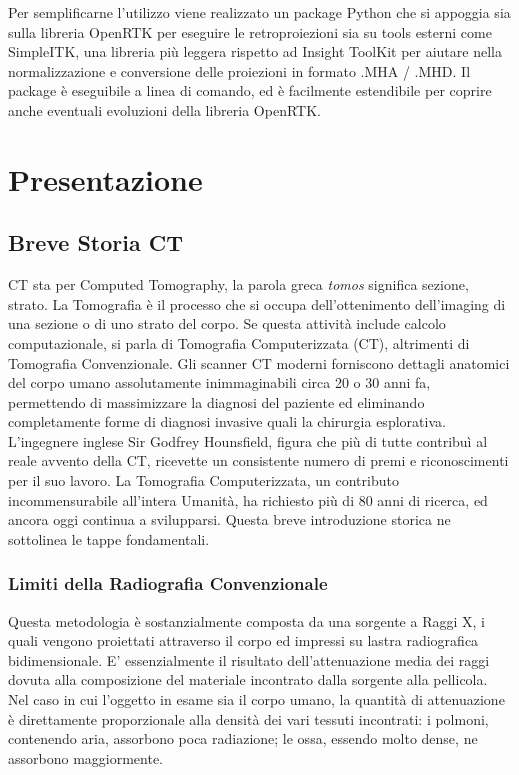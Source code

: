\documentclass[a4paper,12pt, doubleside]{report}
\begin{document}
        \par
            Per semplificarne l'utilizzo viene realizzato un package Python che si appoggia sia sulla libreria OpenRTK per eseguire le retroproiezioni sia su tools esterni come SimpleITK, una libreria più leggera rispetto ad Insight ToolKit per aiutare nella normalizzazione e conversione delle proiezioni in formato .MHA / .MHD.
            Il package è eseguibile a linea di comando, ed è facilmente estendibile per coprire anche eventuali evoluzioni della libreria OpenRTK.
    
        \par
            [TODO nella sezione X si fa Y etc bla di blabla, il secondo di blabla]
    
    \newpage
    \tableofcontents
    \newpage
    \chapter{Presentazione}
        \section{Breve Storia CT}
            \par
                CT sta per Computed Tomography, la parola greca \textit{tomos} significa sezione, strato. La Tomografia è il processo che si occupa dell'ottenimento dell'imaging di una sezione o di uno strato del corpo. Se questa attività include calcolo computazionale, si parla di Tomografia Computerizzata (CT), altrimenti di Tomografia Convenzionale.
                Gli scanner CT moderni forniscono dettagli anatomici del corpo umano assolutamente inimmaginabili circa 20 o 30 anni fa, permettendo di massimizzare la diagnosi del paziente ed eliminando completamente forme di diagnosi invasive quali la chirurgia esplorativa. L'ingegnere inglese Sir Godfrey Hounsfield, figura che più di tutte contribuì al reale avvento della CT, ricevette un consistente numero di premi e riconoscimenti per il suo lavoro. La Tomografia Computerizzata, un contributo incommensurabile all’intera Umanità, ha richiesto più di 80 anni di ricerca, ed ancora oggi continua a svilupparsi. Questa breve introduzione storica ne sottolinea le tappe fondamentali.
            
            \subsection{Limiti della Radiografia Convenzionale}
                \par
                    Questa metodologia è sostanzialmente composta da una sorgente a Raggi X, i quali vengono proiettati attraverso il corpo ed impressi su lastra radiografica bidimensionale. E’ essenzialmente il risultato dell’attenuazione media\cite{hounsfield-nobel-lecture} dei raggi dovuta alla composizione del materiale incontrato dalla sorgente alla pellicola. Nel caso in cui l’oggetto in esame sia il corpo umano, la quantità di attenuazione è direttamente proporzionale alla densità dei vari tessuti incontrati: i polmoni, contenendo aria, assorbono poca radiazione; le ossa, essendo molto dense, ne assorbono maggiormente.
                            
\end{document}
